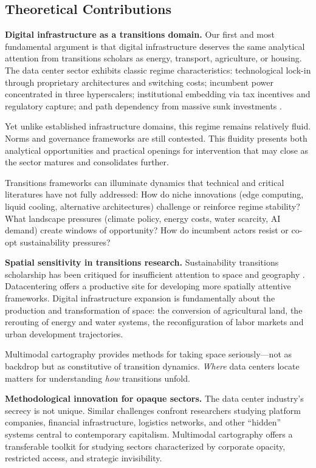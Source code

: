 \documentclass[review]{elsarticle}
\begin{document}
\subsection{Theoretical Contributions}

\textbf{Digital infrastructure as a transitions domain.} Our first and most fundamental argument is that digital infrastructure deserves the same analytical attention from transitions scholars as energy, transport, agriculture, or housing. The data center sector exhibits classic regime characteristics: technological lock-in through proprietary architectures and switching costs; incumbent power concentrated in three hyperscalers; institutional embedding via tax incentives and regulatory capture; and path dependency from massive sunk investments \citep{Sovacool2021}.

Yet unlike established infrastructure domains, this regime remains relatively fluid. Norms and governance frameworks are still contested. This fluidity presents both analytical opportunities and practical openings for intervention that may close as the sector matures and consolidates further.

Transitions frameworks can illuminate dynamics that technical and critical literatures have not fully addressed: How do niche innovations (edge computing, liquid cooling, alternative architectures) challenge or reinforce regime stability? What landscape pressures (climate policy, energy costs, water scarcity, AI demand) create windows of opportunity? How do incumbent actors resist or co-opt sustainability pressures?

\textbf{Spatial sensitivity in transitions research.} Sustainability transitions scholarship has been critiqued for insufficient attention to space and geography \citep{Coenen2012, Hansen2015}. Datacentering offers a productive site for developing more spatially attentive frameworks. Digital infrastructure expansion is fundamentally about the production and transformation of space: the conversion of agricultural land, the rerouting of energy and water systems, the reconfiguration of labor markets and urban development trajectories.

Multimodal cartography provides methods for taking space seriously---not as backdrop but as constitutive of transition dynamics. \textit{Where} data centers locate matters for understanding \textit{how} transitions unfold.

\textbf{Methodological innovation for opaque sectors.} The data center industry's secrecy is not unique. Similar challenges confront researchers studying platform companies, financial infrastructure, logistics networks, and other ``hidden'' systems central to contemporary capitalism. Multimodal cartography offers a transferable toolkit for studying sectors characterized by corporate opacity, restricted access, and strategic invisibility.
\end{document}
